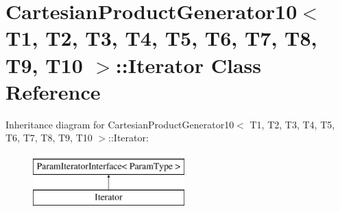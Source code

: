 \hypertarget{classtesting_1_1internal_1_1CartesianProductGenerator10_1_1Iterator}{\section{\-Cartesian\-Product\-Generator10$<$ \-T1, \-T2, \-T3, \-T4, \-T5, \-T6, \-T7, \-T8, \-T9, \-T10 $>$\-:\-:\-Iterator \-Class \-Reference}
\label{d6/db6/classtesting_1_1internal_1_1CartesianProductGenerator10_1_1Iterator}
}
\-Inheritance diagram for \-Cartesian\-Product\-Generator10$<$ \-T1, \-T2, \-T3, \-T4, \-T5, \-T6, \-T7, \-T8, \-T9, \-T10 $>$\-:\-:\-Iterator\-:\begin{figure}[H]
\begin{center}
\leavevmode
\includegraphics[height=2.000000cm]{d6/db6/classtesting_1_1internal_1_1CartesianProductGenerator10_1_1Iterator}
\end{center}
\end{figure}
